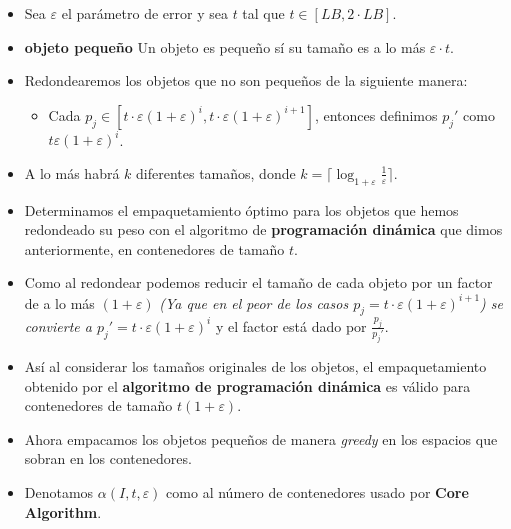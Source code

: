\begin{frame}{\subsectiontitle}
    \begin{itemize}
        \item Sea \(\varepsilon\) el parámetro de error y sea \(t\) tal que \(t \in [LB, 2 \cdot LB]\).
        \item \textbf{objeto pequeño} Un objeto es pequeño sí su tamaño es a lo más \(\varepsilon \cdot t\).
        \item Redondearemos los objetos que no son pequeños de la siguiente manera:
        \begin{itemize}
            \item Cada \(p_{j} \in [t\cdot\varepsilon\left(1 + \varepsilon\right)^{i}, t\cdot\varepsilon\left(1 + \varepsilon\right)^{i + 1}]\), 
            entonces definimos \(p_{j}'\) como \(t\varepsilon(1 + \varepsilon)^{i}\).
        \end{itemize}
        \item A lo más habrá \(k\) diferentes tamaños, donde \(k = \lceil \log_{1 + \varepsilon} \frac{1}{\varepsilon} \rceil\).
        \item Determinamos el empaquetamiento óptimo para los objetos que hemos redondeado su peso con el algoritmo de \textbf{programación dinámica} que dimos anteriormente, en contenedores de tamaño \(t\).
    \end{itemize}
\end{frame}

\begin{frame}{\subsectiontitle} 
    \begin{itemize}
        \item Como al redondear podemos reducir el tamaño de cada objeto por un factor de a lo más \(\left(1 + \varepsilon\right)\) \textit{(Ya que en el peor de los casos \(p_{j} = t\cdot\varepsilon\left(1 + \varepsilon\right)^{i + 1}\)) se convierte a \(p_{j}' = t\cdot\varepsilon\left(1 + \varepsilon\right)^{i}\)} y el factor está dado por \(\frac{p_{j}}{p_{j}'}\).
        \item Así al considerar los tamaños originales de los objetos, el empaquetamiento obtenido por el \textbf{algoritmo de programación dinámica} es válido para contenedores de tamaño \(t\left(1 + \varepsilon\right)\).
        \item Ahora empacamos los objetos pequeños de manera \textit{greedy} en los espacios que sobran en los contenedores.
        \item Denotamos \(\alpha\left(I, t, \varepsilon \right)\) como al número de contenedores usado por \textbf{Core Algorithm}.
    \end{itemize}
\end{frame}

